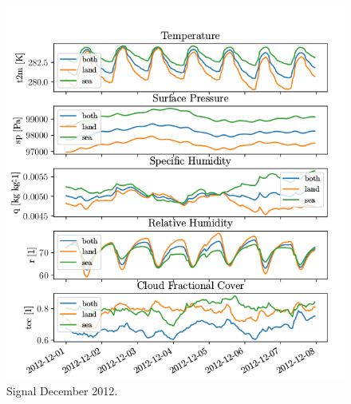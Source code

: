 \begin{figure}[ht]
    \centering
    \includegraphics{python_figs/spatially_averaged_one_week_from_2012-12-01.png}
    \caption{Signal December 2012.}
    \label{fig:dec12}
\end{figure}

